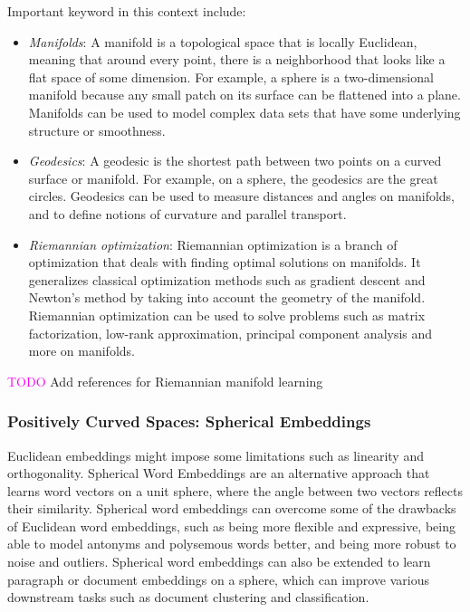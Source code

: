 \documentclass[11pt, a4paper]{amsart}
\begin{document}
Important keyword in this context include:
\begin{itemize}
	\item \emph{Manifolds}:
	A manifold is a topological space that is locally Euclidean, meaning that around every point, there is a neighborhood that looks like a flat space of some dimension.
	For example, a sphere is a two-dimensional manifold because any small patch on its surface can be flattened into a plane.
	Manifolds can be used to model complex data sets that have some underlying structure or smoothness. 
	\item \emph{Geodesics}:
	A geodesic is the shortest path between two points on a curved surface or manifold.
	For example, on a sphere, the geodesics are the great circles.
	Geodesics can be used to measure distances and angles on manifolds, and to define notions of curvature and parallel transport.
	\item \emph{Riemannian optimization}:
	Riemannian optimization is a branch of optimization that deals with finding optimal solutions on manifolds.
	It generalizes classical optimization methods such as gradient descent and Newton’s method by taking into account the geometry of the manifold.
	Riemannian optimization can be used to solve problems such as matrix factorization, low-rank approximation, principal component analysis and more on manifolds.
\end{itemize}

\textcolor{magenta}{TODO} Add references for Riemannian manifold learning

\subsubsection{Positively Curved Spaces: Spherical Embeddings}

Euclidean embeddings might impose some limitations such as linearity and orthogonality.
Spherical Word Embeddings \cite{Meng2019SphericalTE} are an alternative approach that learns word vectors on a unit sphere, where the angle between two vectors reflects their similarity.
Spherical word embeddings can overcome some of the drawbacks of Euclidean word embeddings, such as being more flexible and expressive, being able to model antonyms and polysemous words better, and being more robust to noise and outliers.
Spherical word embeddings can also be extended to learn paragraph or document embeddings on a sphere, which can improve various downstream tasks such as document clustering and classification.
\end{document}
